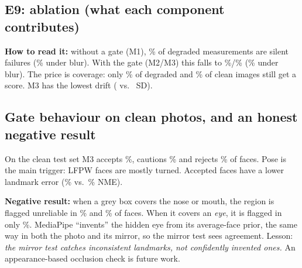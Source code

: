 \subsection{E9: ablation (what each component contributes)}
\begin{center}\small\end{center}
\textbf{How to read it:} without a gate (M1), \silentPoolOne\% of degraded measurements are
silent failures (\silentBlurOne\% under blur). With the gate (M2/M3) this falls to
\silentPoolTwo\%/\silentPoolThree\% (\silentBlurThree\% under blur). The price is coverage:
only \covPoolThree\% of degraded and \covCleanThree\% of clean images still get a score. M3 has
the lowest drift (\driftPoolThree{} vs.\ \driftPoolOne{} SD).

\subsection{Gate behaviour on clean photos, and an honest negative result}
On the clean test set M3 accepts \pAccept\%, cautions \pCaution\% and rejects \pReject\%
of faces. Pose is the main trigger: LFPW faces are mostly turned. Accepted faces have a lower
landmark error (\nmeAccept\% vs.\ \nmeCaution\% NME).

\textbf{Negative result:} when a grey box covers the nose or mouth, the region is flagged
unreliable in \occNose\% and \occMouth\% of faces. When it covers an \emph{eye}, it is
flagged in only \occEye\%. MediaPipe ``invents'' the hidden eye from its average-face prior,
the same way in both the photo and its mirror, so the mirror test sees agreement. Lesson:
\emph{the mirror test catches inconsistent landmarks, not confidently invented ones.} An
appearance-based occlusion check is future work.

